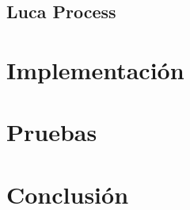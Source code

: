 \documentclass[a4paper,12pt]{article}
\begin{document}
		
		\subsection{Luca Process}
	
	\afterpage{\null\newpage}
	\newpage
	
	\section{Implementación}
	
	\afterpage{\null\newpage}
	\newpage
	
	
	\section{Pruebas}
	
	\afterpage{\null\newpage}
	\newpage
	
	
	
	\section{Conclusión}


	\clearpage
	
	
	
	
	\clearpage
\end{document}
